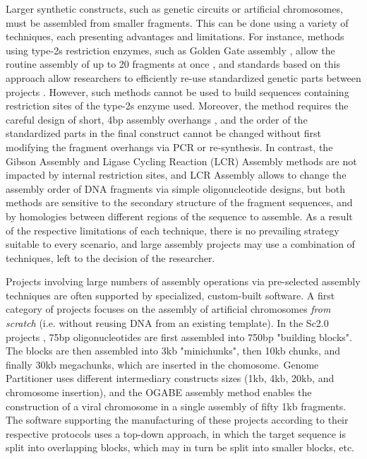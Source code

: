 Larger synthetic constructs, such as genetic circuits or artificial chromosomes, must be assembled from smaller fragments. This can be done using a variety of techniques, each presenting advantages and limitations. For instance, methods using type-2s restriction enzymes, such as Golden Gate assembly \citep{Engler2008}, allow the routine assembly of up to 20 fragments at once \citep{Martella2017, Potapov2018}, and standards based on this approach allow researchers to efficiently re-use standardized genetic parts between projects \citep{Iverson2016, Andreou2017}. However, such methods cannot be used to build sequences containing restriction sites of the type-2s enzyme used. Moreover, the method requires the careful design of short, 4bp assembly overhangs \citep{Potapov2018}, and the order of the standardized parts in the final construct cannot be changed without first modifying the fragment overhangs via PCR or re-synthesis. In contrast, the Gibson Assembly \citep{Gibson2011} and Ligase Cycling Reaction (LCR) Assembly \citep{Kok2014} methods are not impacted by internal restriction sites, and LCR Assembly allows to change the assembly order of DNA fragments via simple oligonucleotide designs, but both methods are sensitive to the secondary structure of the fragment sequences, and by homologies between different regions of the sequence to assemble.
As a result of the respective limitations of each technique, there is no prevailing strategy suitable to every scenario, and large assembly projects may use a combination of techniques, left to the decision of the researcher.

Projects involving large numbers of assembly operations via pre-selected assembly techniques are often supported by specialized, custom-built software. A first category of projects focuses on the assembly of artificial chromosomes \textit{from scratch} (i.e. without reusing DNA from an existing template). In the Sc2.0 projects \citep{Richardson2017}, 75bp oligonucleotides are first assembled into 750bp "building blocks". The blocks are then assembled into 3kb "minichunks", then 10kb chunks, and finally 30kb megachunks, which are inserted in the chomosome. Genome Partitioner \citep{Christen2017} uses different intermediary constructs sizes (1kb, 4kb, 20kb, and chromosome insertion), and the OGABE assembly method \citep{Tsuge2015} enables the construction of a viral chromosome in a single assembly of fifty 1kb fragments. The software supporting the manufacturing of these projects according to their respective protocols uses a top-down approach, in which the target sequence is split into overlapping blocks, which may in turn be split into smaller blocks, etc.

